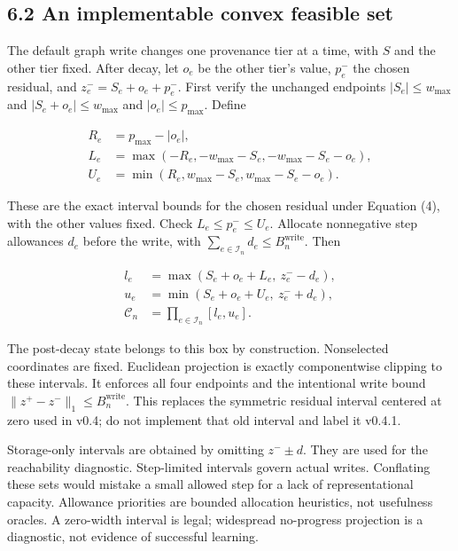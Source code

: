 \documentclass[
  11pt,
  a4paper,
]{article}
\begin{document}
\subsection{6.2 An implementable convex feasible
set}\label{an-implementable-convex-feasible-set}

The default graph write changes one provenance tier at a time, with
\(S\) and the other tier fixed. After decay, let \(o_e\) be the other
tier's value, \(p_e^-\) the chosen residual, and
\(z_e^-=S_e+o_e+p_e^-\). First verify the unchanged endpoints
\(|S_e|\le w_{\max}\) and \(|S_e+o_e|\le w_{\max}\) and
\(|o_e|\le p_{\max}\). Define

\[
\begin{aligned}
R_e&=p_{\max}-|o_e|,\\
L_e&=\max(-R_e,-w_{\max}-S_e,-w_{\max}-S_e-o_e),\\
U_e&=\min(R_e, w_{\max}-S_e, w_{\max}-S_e-o_e).
\end{aligned}
\tag{18}
\]

These are the exact interval bounds for the chosen residual under
Equation (4), with the other values fixed. Check
\(L_e\le p_e^-\le U_e\). Allocate nonnegative step allowances \(d_e\)
before the write, with
\(\sum_{e\in\mathcal I_n}d_e\le B_n^{\mathrm{write}}\). Then

\[
\begin{aligned}
l_e&=\max(S_e+o_e+L_e,\ z_e^- -d_e),\\
u_e&=\min(S_e+o_e+U_e,\ z_e^- +d_e),\\
\mathcal C_n&=\prod_{e\in\mathcal I_n}[l_e,u_e].
\end{aligned}
\tag{19}
\]

The post-decay state belongs to this box by construction. Nonselected
coordinates are fixed. Euclidean projection is exactly componentwise
clipping to these intervals. It enforces all four endpoints and the
intentional write bound \(\|z^+-z^-\|_1\le B_n^{\mathrm{write}}\). This
replaces the symmetric residual interval centered at zero used in v0.4;
do not implement that old interval and label it v0.4.1.

Storage-only intervals are obtained by omitting \(z^-\pm d\). They are
used for the reachability diagnostic. Step-limited intervals govern
actual writes. Conflating these sets would mistake a small allowed step
for a lack of representational capacity. Allowance priorities are
bounded allocation heuristics, not usefulness oracles. A zero-width
interval is legal; widespread no-progress projection is a diagnostic,
not evidence of successful learning.
\end{document}
